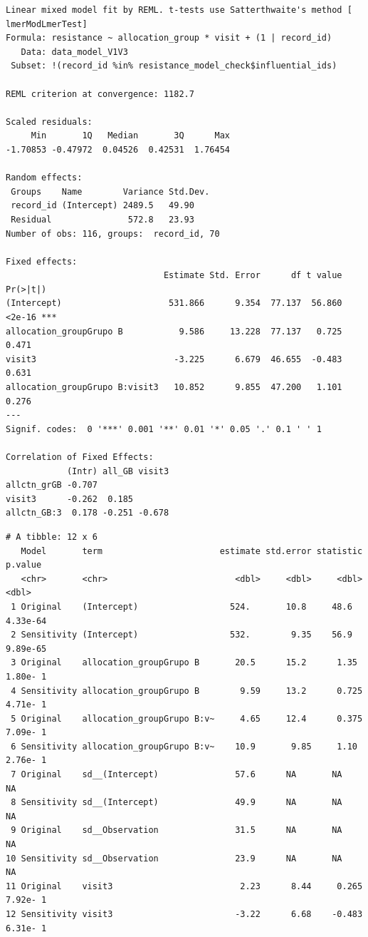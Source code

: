 \documentclass[
  letterpaper,
  DIV=11,
  numbers=noendperiod]{scrartcl}
\newenvironment{Shaded}{\begin{snugshade}}{\end{snugshade}}
\newcommand{\NormalTok}[1]{\textcolor[rgb]{0.00,0.23,0.31}{#1}}
\newcommand{\SpecialCharTok}[1]{\textcolor[rgb]{0.37,0.37,0.37}{#1}}
\begin{document}
\begin{verbatim}
Linear mixed model fit by REML. t-tests use Satterthwaite's method [
lmerModLmerTest]
Formula: resistance ~ allocation_group * visit + (1 | record_id)
   Data: data_model_V1V3
 Subset: !(record_id %in% resistance_model_check$influential_ids)

REML criterion at convergence: 1182.7

Scaled residuals: 
     Min       1Q   Median       3Q      Max 
-1.70853 -0.47972  0.04526  0.42531  1.76454 

Random effects:
 Groups    Name        Variance Std.Dev.
 record_id (Intercept) 2489.5   49.90   
 Residual               572.8   23.93   
Number of obs: 116, groups:  record_id, 70

Fixed effects:
                               Estimate Std. Error      df t value Pr(>|t|)    
(Intercept)                     531.866      9.354  77.137  56.860   <2e-16 ***
allocation_groupGrupo B           9.586     13.228  77.137   0.725    0.471    
visit3                           -3.225      6.679  46.655  -0.483    0.631    
allocation_groupGrupo B:visit3   10.852      9.855  47.200   1.101    0.276    
---
Signif. codes:  0 '***' 0.001 '**' 0.01 '*' 0.05 '.' 0.1 ' ' 1

Correlation of Fixed Effects:
            (Intr) all_GB visit3
allctn_grGB -0.707              
visit3      -0.262  0.185       
allctn_GB:3  0.178 -0.251 -0.678
\end{verbatim}

\begin{Shaded}
\end{Shaded}

\begin{verbatim}
# A tibble: 12 x 6
   Model       term                       estimate std.error statistic   p.value
   <chr>       <chr>                         <dbl>     <dbl>     <dbl>     <dbl>
 1 Original    (Intercept)                  524.       10.8     48.6    4.33e-64
 2 Sensitivity (Intercept)                  532.        9.35    56.9    9.89e-65
 3 Original    allocation_groupGrupo B       20.5      15.2      1.35   1.80e- 1
 4 Sensitivity allocation_groupGrupo B        9.59     13.2      0.725  4.71e- 1
 5 Original    allocation_groupGrupo B:v~     4.65     12.4      0.375  7.09e- 1
 6 Sensitivity allocation_groupGrupo B:v~    10.9       9.85     1.10   2.76e- 1
 7 Original    sd__(Intercept)               57.6      NA       NA     NA       
 8 Sensitivity sd__(Intercept)               49.9      NA       NA     NA       
 9 Original    sd__Observation               31.5      NA       NA     NA       
10 Sensitivity sd__Observation               23.9      NA       NA     NA       
11 Original    visit3                         2.23      8.44     0.265  7.92e- 1
12 Sensitivity visit3                        -3.22      6.68    -0.483  6.31e- 1
\end{verbatim}
\end{document}
